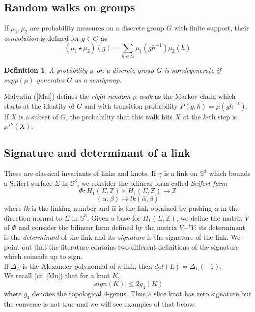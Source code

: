 \documentclass[10pt,a4paper]{amsart}
\newtheorem{defn}{Definition}
\begin{document}
\subsection{Random walks on groups}\label{paragraph on random walks}
If $\mu_1,\mu_2$ are probability measures on a discrete group $G$ with finite support, their {\it convolution} is defined for $g\in G$ as 
\begin{equation}\label{definition de la convolution}
(\mu_1\star\mu_2)(g)=\sum_{h\in G}\mu_1(gh^{-1})\mu_2(h)
\end{equation}
\begin{defn}\label{non degenerate}
	A  probability $\mu$ on a discrete group $G$ is nondegenerate if $supp(\mu)$ generates $G$ as a semigroup.\end{defn} Malyutin ([Mal]) defines the {\it  right random $\mu$-walk} as the Markov chain which starts at the identity of $G$ and with transition probability $P(g,h)=\mu(gh^{-1})$. If $X$ is a subset of $G$, the probability that this walk hits $X$ at the $k$-th step is $\mu^{\star k}(X)$. 
\subsection{Signature and determinant of a link}\label{definition de la signature}
These are classical invariants of links and knots. 
If $\gamma$ is a link on $\mathbb{S}^3$ which bounds a Seifert surface $\Sigma$ in $\mathbb{S}^3$, we consider the bilinear form called {\it Seifert form} $$\Phi: H_1(\Sigma,\mathbb{Z})\times H_1(\Sigma, \mathbb{Z})\longrightarrow\mathbb{Z}$$
$$(\alpha,\beta)\mapsto lk(\hat{\alpha},\beta)$$ where $lk$ is the linking number and $\hat{\alpha}$ is the link obtained by pushing $\alpha$ in the direction normal to $\Sigma$ in $\mathbb{S}^3$. Given a base for $H_1(\Sigma, \mathbb{Z})$, we define the matrix $V$ of $\Phi$ and consider the bilinear form defined by the matrix $V+^tV$: its determinant is the {\it determinant} of the link and its {\it signature} is the signature of the link. We point out that the literature contains two different definitions of the signature which coincide up to sign.\\
If $\Delta_L$ is the Alexander polynomial of a link, then $det(L)=\Delta_L(-1)$.\\ 
We recall (cf. [Mu]) that for a knot $K$, 
\begin{equation}
|sign(K)|\leq 2g_4(K)
\end{equation} where $g_4$ denotes the topological $4$-genus.  Thus a slice knot has zero signature but the converse is not true and we will see examples of that below.
\end{document}
